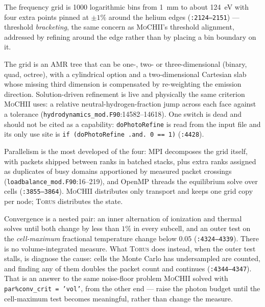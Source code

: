 \documentclass[english,a4paper]{my_memo}
\newcommand{\code}[1]{\texttt{#1}}
\newcommand{\MoCHII}{\textsc{MoCHII}}
\newcommand{\Torus}{\textsc{Torus}}
\begin{document}
The frequency grid is 1000 logarithmic bins from 1~mm to about 124~eV with
four extra points pinned at $\pm1\%$ around the helium edges
(\code{:2124--2151}) --- threshold \emph{bracketing}, the same concern as
\MoCHII{}'s threshold alignment, addressed by refining around the edge rather
than by placing a bin boundary on it.

The grid is an AMR tree that can be one-, two- or three-dimensional (binary,
quad, octree), with a cylindrical option and a two-dimensional Cartesian slab
whose missing third dimension is compensated by re-weighting the emission
direction.  Solution-driven refinement is live and physically the same
criterion \MoCHII{} uses: a relative neutral-hydrogen-fraction jump across
each face against a tolerance
(\code{hydrodynamics\_mod.F90}:14582--14618).  One switch is dead and should
not be cited as a capability: \code{doPhotoRefine} is read from the input file
and its only use site is \code{if (doPhotoRefine .and. 0 == 1)}
(\code{:4428}).

Parallelism is the most developed of the four: MPI decomposes the grid
itself, with packets shipped between ranks in batched stacks, plus extra
ranks assigned as duplicates of busy domains apportioned by measured packet
crossings (\code{loadbalance\_mod.F90}:16--219), and OpenMP threads the
equilibrium solve over cells (\code{:3855--3864}).  \MoCHII{} distributes only
transport and keeps one grid copy per node; \Torus{} distributes the state.

Convergence is a nested pair: an inner alternation of ionization and thermal
solves until both change by less than $1\%$ in every subcell, and an outer
test on the \emph{cell-maximum} fractional temperature change below $0.05$
(\code{:4324--4339}).  There is no volume-integrated measure.  What \Torus{}
does instead, when the outer test stalls, is diagnose the cause: cells the
Monte Carlo has undersampled are counted, and finding any of them doubles the
packet count and continues (\code{:4344--4347}).  That is an answer to the
same noise-floor problem \MoCHII{} solved with \code{par\%conv\_crit =
'vol'}, from the other end --- raise the photon budget until the cell-maximum
test becomes meaningful, rather than change the measure.
\end{document}
